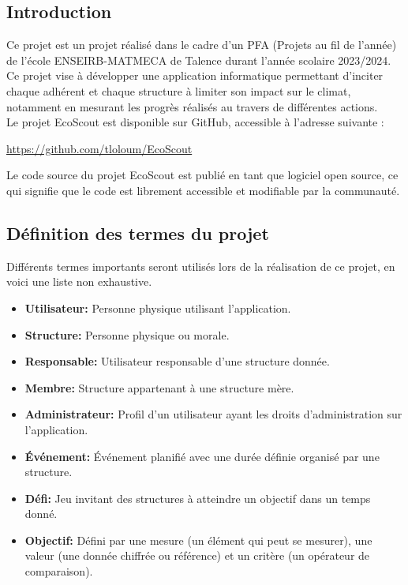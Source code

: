 \subsection{Introduction}

Ce projet est un projet réalisé dans le cadre d'un PFA (Projets au fil de l'année)
de l'école ENSEIRB-MATMECA de Talence durant l'année scolaire 2023/2024. Ce projet
vise à développer une application informatique permettant d’inciter chaque adhérent
et chaque structure à limiter son impact sur le climat, notamment en mesurant les 
progrès réalisés au travers de différentes actions.\\
\newline
Le projet EcoScout est disponible sur GitHub, accessible à l'adresse suivante :
\begin{center}
    \url{https://github.com/tloloum/EcoScout}
\end{center}
Le code source du projet EcoScout est publié en tant que logiciel open source, 
ce qui signifie que le code est librement accessible et modifiable par la communauté. 


\subsection{Définition des termes du projet}

Différents termes importants seront utilisés lors de la réalisation de ce projet, en voici une liste non exhaustive.
\begin{itemize}
    \item \textbf{Utilisateur:} Personne physique utilisant l'application.
    \item \textbf{Structure:} Personne physique ou morale.
    \item \textbf{Responsable:} Utilisateur responsable d'une structure donnée.
    \item \textbf{Membre:} Structure appartenant à une structure mère.
    \item \textbf{Administrateur:} Profil d'un utilisateur ayant les droits d'administration sur l'application.
    \item \textbf{Événement:} Événement planifié avec une durée définie organisé par une structure.
    \item \textbf{Défi:} Jeu invitant des structures à atteindre un objectif dans un temps donné.
    \item \textbf{Objectif:} Défini par une mesure (un élément qui peut se mesurer), une valeur (une donnée chiffrée ou référence) 
    et un critère (un opérateur de comparaison). 
\end{itemize}

